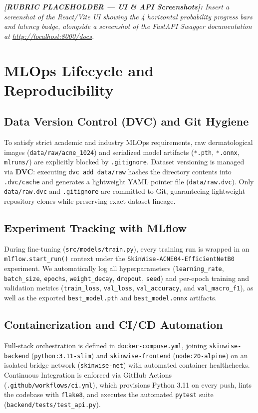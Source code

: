 \documentclass[11pt,a4paper]{article}
\begin{document}
\noindent
\textit{\textbf{[RUBRIC PLACEHOLDER --- UI \& API Screenshots]:} Insert a screenshot of the React/Vite UI showing the 4 horizontal probability progress bars and latency badge, alongside a screenshot of the FastAPI Swagger documentation at \url{http://localhost:8000/docs}.}

\section{MLOps Lifecycle and Reproducibility}
\label{sec:mlops}

\subsection{Data Version Control (DVC) and Git Hygiene}
To satisfy strict academic and industry MLOps requirements, raw dermatological images (\texttt{data/raw/acne\_1024}) and serialized model artifacts (\texttt{*.pth}, \texttt{*.onnx}, \texttt{mlruns/}) are explicitly blocked by \texttt{.gitignore}. Dataset versioning is managed via \textbf{DVC}: executing \texttt{dvc add data/raw} hashes the directory contents into \texttt{.dvc/cache} and generates a lightweight YAML pointer file (\texttt{data/raw.dvc}). Only \texttt{data/raw.dvc} and \texttt{.gitignore} are committed to Git, guaranteeing lightweight repository clones while preserving exact dataset lineage.

\subsection{Experiment Tracking with MLflow}
During fine-tuning (\texttt{src/models/train.py}), every training run is wrapped in an \texttt{mlflow.start\_run()} context under the \texttt{SkinWise-ACNE04-EfficientNetB0} experiment. We automatically log all hyperparameters (\texttt{learning\_rate}, \texttt{batch\_size}, \texttt{epochs}, \texttt{weight\_decay}, \texttt{dropout}, \texttt{seed}) and per-epoch training and validation metrics (\texttt{train\_loss}, \texttt{val\_loss}, \texttt{val\_accuracy}, and \texttt{val\_macro\_f1}), as well as the exported \texttt{best\_model.pth} and \texttt{best\_model.onnx} artifacts.

\subsection{Containerization and CI/CD Automation}
Full-stack orchestration is defined in \texttt{docker-compose.yml}, joining \texttt{skinwise-backend} (\texttt{python:3.11-slim}) and \texttt{skinwise-frontend} (\texttt{node:20-alpine}) on an isolated bridge network (\texttt{skinwise-net}) with automated container healthchecks. Continuous Integration is enforced via GitHub Actions (\texttt{.github/workflows/ci.yml}), which provisions Python 3.11 on every push, lints the codebase with \texttt{flake8}, and executes the automated \texttt{pytest} suite (\texttt{backend/tests/test\_api.py}).
\end{document}
